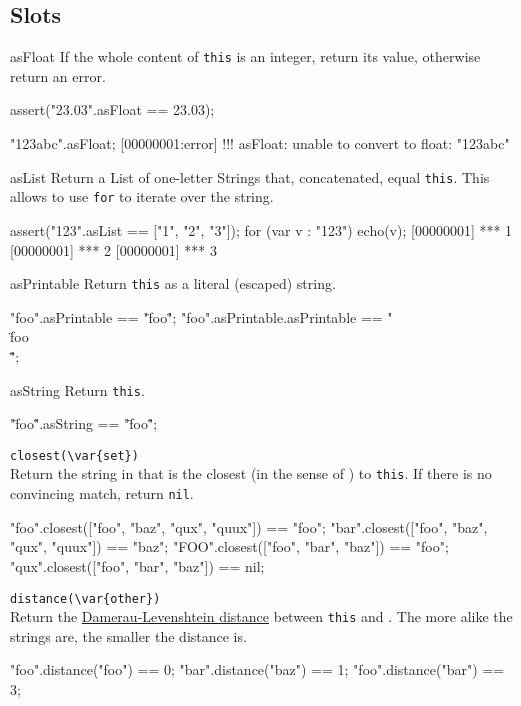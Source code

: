 \subsection{Slots}
\begin{urbiscriptapi}
\item[asFloat]
  If the whole content of \lstinline|this| is an integer, return its
  value, otherwise return an error.
\begin{urbiscript}
assert("23.03".asFloat == 23.03);

"123abc".asFloat;
[00000001:error] !!! asFloat: unable to convert to float: "123abc"
\end{urbiscript}

\item[asList]
  Return a List of one-letter Strings that, concatenated, equal
  \lstinline|this|.  This allows to use \lstinline|for| to iterate
  over the string.
\begin{urbiscript}
assert("123".asList == ["1", "2", "3"]);
for (var v : "123")
  echo(v);
[00000001] *** 1
[00000001] *** 2
[00000001] *** 3
\end{urbiscript}

\item[asPrintable]
  Return \lstinline|this| as a literal (escaped) string.
\begin{urbiassert}
"foo".asPrintable == "\"foo\"";
"foo".asPrintable.asPrintable == "\"\\\"foo\\\"\"";
\end{urbiassert}

\item[asString]
  Return \lstinline|this|.
\begin{urbiassert}
"\"foo\"".asString == "\"foo\"";
\end{urbiassert}

\item \lstinline|closest(\var{set})|\\
  Return the string in  that is the closest (in the sense of
  ) to \lstinline|this|.  If there is no
  convincing match, return \lstinline|nil|.
\begin{urbiassert}
"foo".closest(["foo", "baz", "qux", "quux"]) == "foo";
"bar".closest(["foo", "baz", "qux", "quux"]) == "baz";
"FOO".closest(["foo", "bar", "baz"])         == "foo";
"qux".closest(["foo", "bar", "baz"])         == nil;
\end{urbiassert}

\item \lstinline|distance(\var{other})|\\
  Return the
  \href{http://en.wikipedia.org/wiki/Damerau-Levenshtein_distance}
  {Damerau-Levenshtein distance} between \lstinline|this| and
  .  The more alike the strings are, the smaller the
  distance is.
\begin{urbiassert}
"foo".distance("foo") == 0;
"bar".distance("baz") == 1;
"foo".distance("bar") == 3;
\end{urbiassert}


\end{urbiscriptapi}
